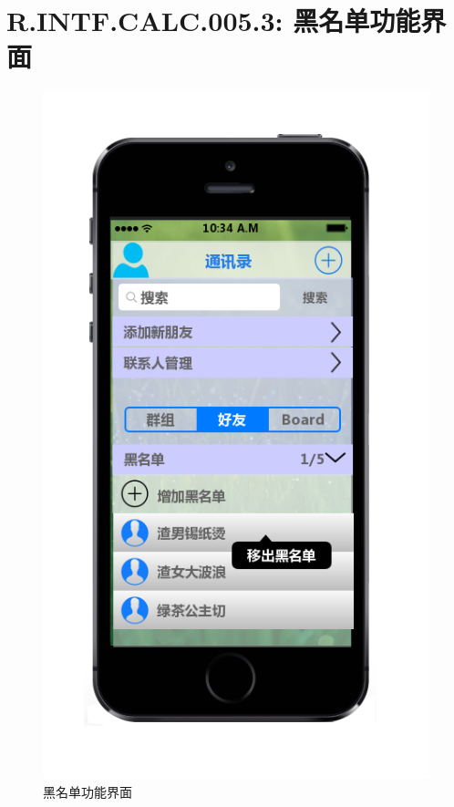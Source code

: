    \section{R.INTF.CALC.005.3: 黑名单功能界面}
    \begin{figure}[h]
        \centering
        \includegraphics[scale=0.6]{OutlineDesign/figures/黑名单功能界面.png}
        \caption{黑名单功能界面}
        \label{fig:server_flow}
    \end{figure}
    \newpage
